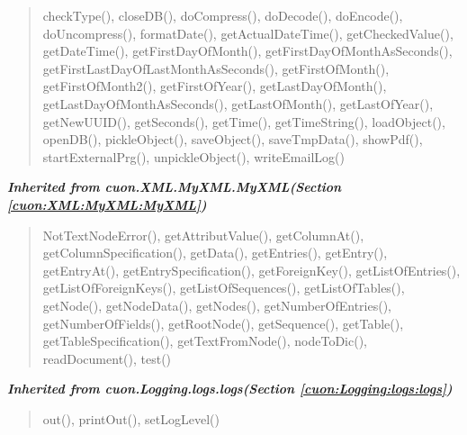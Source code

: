 \begin{quote}
checkType(), closeDB(), doCompress(), doDecode(), doEncode(), doUncompress(), formatDate(), getActualDateTime(), getCheckedValue(), getDateTime(), getFirstDayOfMonth(), getFirstDayOfMonthAsSeconds(), getFirstLastDayOfLastMonthAsSeconds(), getFirstOfMonth(), getFirstOfMonth2(), getFirstOfYear(), getLastDayOfMonth(), getLastDayOfMonthAsSeconds(), getLastOfMonth(), getLastOfYear(), getNewUUID(), getSeconds(), getTime(), getTimeString(), loadObject(), openDB(), pickleObject(), saveObject(), saveTmpData(), showPdf(), startExternalPrg(), unpickleObject(), writeEmailLog()
\end{quote}

\large{\textbf{\textit{Inherited from cuon.XML.MyXML.MyXML\textit{(Section \ref{cuon:XML:MyXML:MyXML})}}}}

\begin{quote}
NotTextNodeError(), getAttributValue(), getColumnAt(), getColumnSpecification(), getData(), getEntries(), getEntry(), getEntryAt(), getEntrySpecification(), getForeignKey(), getListOfEntries(), getListOfForeignKeys(), getListOfSequences(), getListOfTables(), getNode(), getNodeData(), getNodes(), getNumberOfEntries(), getNumberOfFields(), getRootNode(), getSequence(), getTable(), getTableSpecification(), getTextFromNode(), nodeToDic(), readDocument(), test()
\end{quote}

\large{\textbf{\textit{Inherited from cuon.Logging.logs.logs\textit{(Section \ref{cuon:Logging:logs:logs})}}}}

\begin{quote}
out(), printOut(), setLogLevel()
\end{quote}

